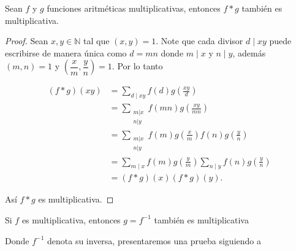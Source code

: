 \begin{theorem}
Sean $f$ y $g$ funciones aritméticas multiplicativas, entonces $f * g$ también es multiplicativa.
\end{theorem}

\begin{proof}
Sean $x, y \in \mathbb{N}$ tal que $(x, y)=1$. Note que cada divisor $d \mid xy$ puede escribirse de manera única como $d=mn$ donde $m \mid x$ y $n \mid y$, además $(m, n)=1$ y $\left(\dfrac{x}{m}, \dfrac{y}{n}\right)=1$. Por lo tanto

$$
\begin{aligned}
(f * g)(xy) & =\sum_{d \mid xy} f(d) g\left(\frac{xy}{d}\right) \\
& =\sum_{\substack{m|x \\
n| y}} f(mn) g\left(\frac{xy}{mn}\right) \\
& =\sum_{\substack{m|x \\
n| y}} f(m) g\left(\frac{x}{m}\right) f(n) g\left(\frac{y}{n}\right) \\
& =\sum_{m \mid x} f(m) g\left(\frac{y}{m}\right) \sum_{n \mid y} f(n) g\left(\frac{y}{n}\right) \\
& =(f * g)(x)(f * g)(y) .
\end{aligned}
$$

Así $f * g$ es multiplicativa.
\end{proof}


\begin{theorem}
Si $f$ es multiplicativa, entonces $g=f^{-1}$ también es multiplicativa
\end{theorem}

Donde $f^{-1}$ denota su inversa, presentaremos una prueba siguiendo a \cite{hildebrand2006introduction}\\

